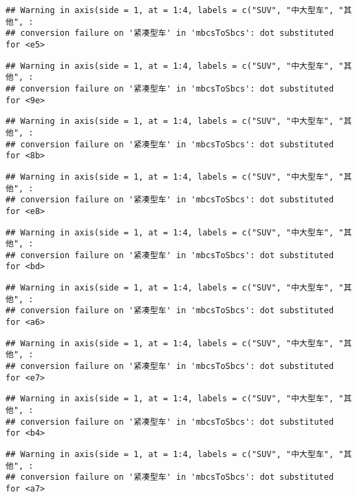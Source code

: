 \documentclass[]{article}
\begin{document}
\begin{verbatim}
## Warning in axis(side = 1, at = 1:4, labels = c("SUV", "中大型车", "其他", :
## conversion failure on '紧凑型车' in 'mbcsToSbcs': dot substituted for <e5>
\end{verbatim}

\begin{verbatim}
## Warning in axis(side = 1, at = 1:4, labels = c("SUV", "中大型车", "其他", :
## conversion failure on '紧凑型车' in 'mbcsToSbcs': dot substituted for <9e>
\end{verbatim}

\begin{verbatim}
## Warning in axis(side = 1, at = 1:4, labels = c("SUV", "中大型车", "其他", :
## conversion failure on '紧凑型车' in 'mbcsToSbcs': dot substituted for <8b>
\end{verbatim}

\begin{verbatim}
## Warning in axis(side = 1, at = 1:4, labels = c("SUV", "中大型车", "其他", :
## conversion failure on '紧凑型车' in 'mbcsToSbcs': dot substituted for <e8>
\end{verbatim}

\begin{verbatim}
## Warning in axis(side = 1, at = 1:4, labels = c("SUV", "中大型车", "其他", :
## conversion failure on '紧凑型车' in 'mbcsToSbcs': dot substituted for <bd>
\end{verbatim}

\begin{verbatim}
## Warning in axis(side = 1, at = 1:4, labels = c("SUV", "中大型车", "其他", :
## conversion failure on '紧凑型车' in 'mbcsToSbcs': dot substituted for <a6>
\end{verbatim}

\begin{verbatim}
## Warning in axis(side = 1, at = 1:4, labels = c("SUV", "中大型车", "其他", :
## conversion failure on '紧凑型车' in 'mbcsToSbcs': dot substituted for <e7>
\end{verbatim}

\begin{verbatim}
## Warning in axis(side = 1, at = 1:4, labels = c("SUV", "中大型车", "其他", :
## conversion failure on '紧凑型车' in 'mbcsToSbcs': dot substituted for <b4>
\end{verbatim}

\begin{verbatim}
## Warning in axis(side = 1, at = 1:4, labels = c("SUV", "中大型车", "其他", :
## conversion failure on '紧凑型车' in 'mbcsToSbcs': dot substituted for <a7>
\end{verbatim}
\end{document}
